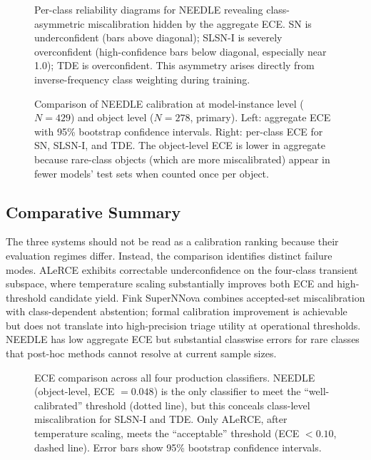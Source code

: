 \documentclass[twocolumn]{aastex631}
\begin{document}
\begin{figure}
\caption{Per-class reliability diagrams for NEEDLE revealing class-asymmetric miscalibration hidden by the aggregate ECE. SN is underconfident (bars above diagonal); SLSN-I is severely overconfident (high-confidence bars below diagonal, especially near 1.0); TDE is overconfident. This asymmetry arises directly from inverse-frequency class weighting during training. \label{fig:needle_perclass}}
\end{figure}

\begin{figure}
\caption{Comparison of NEEDLE calibration at model-instance level ($N = 429$) and object level ($N = 278$, primary). Left: aggregate ECE with 95\% bootstrap confidence intervals. Right: per-class ECE for SN, SLSN-I, and TDE. The object-level ECE is lower in aggregate because rare-class objects (which are more miscalibrated) appear in fewer models' test sets when counted once per object. \label{fig:needle_comparison}}
\end{figure}

\subsection{Comparative Summary}\label{sec:comparative}

The three systems should not be read as a calibration ranking
because their evaluation regimes differ. Instead, the comparison
identifies distinct failure modes. ALeRCE exhibits correctable
underconfidence on the four-class transient subspace, where
temperature scaling substantially improves both ECE and
high-threshold candidate yield. Fink SuperNNova combines
accepted-set miscalibration with class-dependent abstention;
formal calibration improvement is achievable but does not
translate into high-precision triage utility at operational
thresholds. NEEDLE has low aggregate ECE but substantial
classwise errors for rare classes that post-hoc methods cannot
resolve at current sample sizes.

\begin{figure}
\caption{ECE comparison across all four production classifiers. NEEDLE (object-level, ECE $= 0.048$) is the only classifier to meet the ``well-calibrated'' threshold (dotted line), but this conceals class-level miscalibration for SLSN-I and TDE. Only ALeRCE, after temperature scaling, meets the ``acceptable'' threshold (ECE $< 0.10$, dashed line). Error bars show 95\% bootstrap confidence intervals. \label{fig:summary}}
\end{figure}
\end{document}
